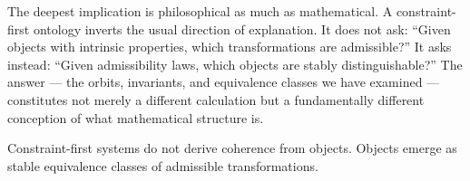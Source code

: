 \documentclass[12pt, a4paper]{article}
\theoremstyle{plain}
\theoremstyle{definition}
\theoremstyle{correspondence}
\begin{document}
The deepest implication is philosophical as much as mathematical. A constraint-first
ontology inverts the usual direction of explanation. It does not ask: ``Given objects
with intrinsic properties, which transformations are admissible?'' It asks instead:
``Given admissibility laws, which objects are stably distinguishable?'' The answer ---
the orbits, invariants, and equivalence classes we have examined --- constitutes not
merely a different calculation but a fundamentally different conception of what
mathematical structure is.

Constraint-first systems do not derive coherence from objects. Objects emerge as stable
equivalence classes of admissible transformations.

\newpage
\end{document}
